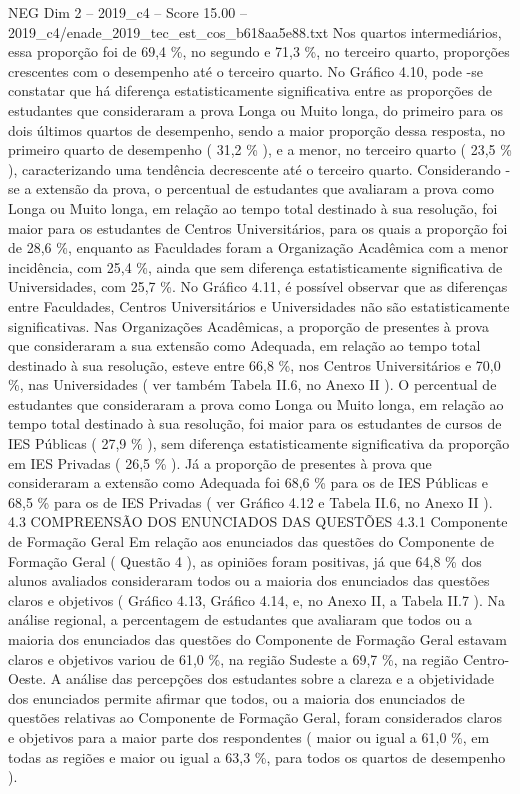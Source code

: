 \begin{textsample}{NEG Dim 2 – 2019\_c4 – Score 15.00 – 2019\_c4/enade\_2019\_tec\_est\_cos\_b618aa5e88.txt}
Nos quartos intermediários, essa proporção foi de 69,4 \%, no segundo e 71,3 \%, no terceiro quarto, proporções crescentes com o desempenho até o terceiro quarto.
No Gráfico 4.10, pode -se constatar que há diferença estatisticamente significativa entre as proporções de estudantes que consideraram a prova Longa ou Muito longa, do primeiro para os dois últimos quartos de desempenho, sendo a maior proporção dessa resposta, no primeiro quarto de desempenho ( 31,2 \% ), e a menor, no terceiro quarto ( 23,5 \% ), caracterizando uma tendência decrescente até o terceiro quarto.
Considerando -se a extensão da prova, o percentual de estudantes que avaliaram a prova como Longa ou Muito longa, em relação ao tempo total destinado à sua resolução, foi maior para os estudantes de Centros Universitários, para os quais a proporção foi de 28,6 \%, enquanto as Faculdades foram a Organização Acadêmica com a menor incidência, com 25,4 \%, ainda que sem diferença estatisticamente significativa de Universidades, com 25,7 \%.
No Gráfico 4.11, é possível observar que as diferenças entre Faculdades, Centros Universitários e Universidades não são estatisticamente significativas.
Nas Organizações Acadêmicas, a proporção de presentes à prova que consideraram a sua extensão como Adequada, em relação ao tempo total destinado à sua resolução, esteve entre 66,8 \%, nos Centros Universitários e 70,0 \%, nas Universidades ( ver também Tabela II.6, no Anexo II ).
O percentual de estudantes que consideraram a prova como Longa ou Muito longa, em relação ao tempo total destinado à sua resolução, foi maior para os estudantes de cursos de IES Públicas ( 27,9 \% ), sem diferença estatisticamente significativa da proporção em IES Privadas ( 26,5 \% ).
Já a proporção de presentes à prova que consideraram a extensão como Adequada foi 68,6 \% para os de IES Públicas e 68,5 \% para os de IES Privadas ( ver Gráfico 4.12 e Tabela II.6, no Anexo II ). 4.3 COMPREENSÃO DOS ENUNCIADOS DAS QUESTÕES 4.3.1 Componente de Formação Geral Em relação aos enunciados das questões do Componente de Formação Geral ( Questão 4 ), as opiniões foram positivas, já que 64,8 \% dos alunos avaliados consideraram todos ou a maioria dos enunciados das questões claros e objetivos ( Gráfico 4.13, Gráfico 4.14, e, no Anexo II, a Tabela II.7 ).
Na análise regional, a percentagem de estudantes que avaliaram que todos ou a maioria dos enunciados das questões do Componente de Formação Geral estavam claros e objetivos variou de 61,0 \%, na região Sudeste a 69,7 \%, na região Centro-Oeste.
A análise das percepções dos estudantes sobre a clareza e a objetividade dos enunciados permite afirmar que todos, ou a maioria dos enunciados de questões relativas ao Componente de Formação Geral, foram considerados claros e objetivos para a maior parte dos respondentes ( maior ou igual a 61,0 \%, em todas as regiões e maior ou igual a 63,3 \%, para todos os quartos de desempenho ).

\end{textsample}
